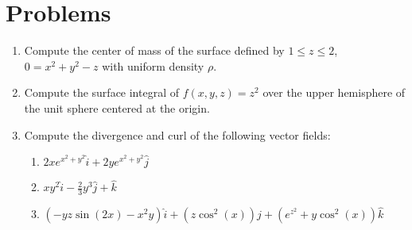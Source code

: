 \documentclass[letterpaper,11pt]{article}
\begin{document}
\section*{Problems}
\begin{enumerate}
\item Compute the center of mass of the surface defined by $1 \leq z \leq 2$, $0 = x^2 + y^2 - z$ with uniform density $\rho$.
  \newpage
\item Compute the surface integral of $f(x, y, z) = z^2$ over the upper hemisphere of the unit sphere centered at the origin.
  \newline
  \newline
  \newline
  \newline
  \newline
  \newline
  \newline
  \newline
  \newline
  \newline
  \newline
  \newline
  \newline
  \newline
  \newline
  \newline
  \newline
\item Compute the divergence and curl of the following vector fields:
  \begin{enumerate}
  \item $2 x e^{x^2 + y^2} \hat{i} + 2 y e^{x^2 + y^2} \hat{j}$
    \newline
    \newline
    \newline
    \newline
    \newline
    \newline
  \item $x y^2 \hat{i} - \frac{2}{3} y^3 \hat{j} + \hat{k}$
    \newline
    \newline
    \newline
    \newline
    \newline
    \newline
  \item $(-y z \sin(2 x) - x^2 y) \hat{i} + (z \cos^2(x)) \hat{j} + (e^{z^2} + y \cos^2(x)) \hat{k}$
    \newline
    \newline
    \newline
    \newline
    \newline
    \newline
  \end{enumerate}
\end{enumerate}
\end{document}
